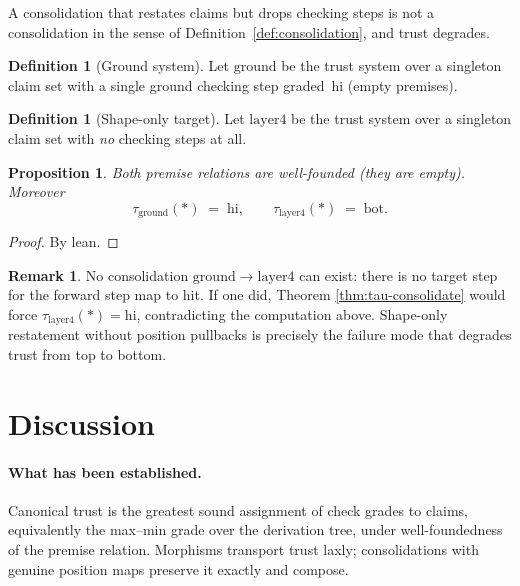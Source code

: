 \documentclass[11pt,a4paper]{article}
\theoremstyle{plain}
\newtheorem{proposition}[theorem]{Proposition}
\theoremstyle{definition}
\newtheorem{definition}[theorem]{Definition}
\newtheorem{remark}[theorem]{Remark}
\newcommand{\bott}{\mathrm{bot}}
\newcommand{\tauCan}{\tau}
\begin{document}
A consolidation that restates claims but drops checking steps is not a
consolidation in the sense of Definition~\ref{def:consolidation}, and
trust degrades.

\begin{definition}[Ground system]\label{def:ground}
Let $\mathrm{ground}$ be the trust system over a singleton claim set with
a single ground checking step graded~$\mathrm{hi}$ (empty premises).
\end{definition}

\begin{definition}[Shape-only target]\label{def:layer4}
Let $\mathrm{layer4}$ be the trust system over a singleton claim set with
\emph{no} checking steps at all.
\end{definition}

\begin{proposition}\label{prop:ground-layer4}
Both premise relations are well-founded (they are empty). Moreover
\[
  \tauCan_{\mathrm{ground}}(\ast) \;=\; \mathrm{hi},
  \qquad
  \tauCan_{\mathrm{layer4}}(\ast) \;=\; \bott.
\]
\end{proposition}

\begin{proof}
By lean.
\end{proof}

\begin{remark}
No consolidation $\mathrm{ground} \to \mathrm{layer4}$ can exist: there is
no target step for the forward step map to hit. If one did, Theorem
\ref{thm:tau-consolidate} would force
$\tauCan_{\mathrm{layer4}}(\ast) = \mathrm{hi}$, contradicting the
computation above. Shape-only restatement without position pullbacks is
precisely the failure mode that degrades trust from top to bottom.
\end{remark}

\section{Discussion}

\paragraph{What has been established.}
Canonical trust is the greatest sound assignment of check grades to
claims, equivalently the max--min grade over the derivation tree, under
well-foundedness of the premise relation. Morphisms transport trust
laxly; consolidations with genuine position maps preserve it exactly and
compose.
\end{document}
